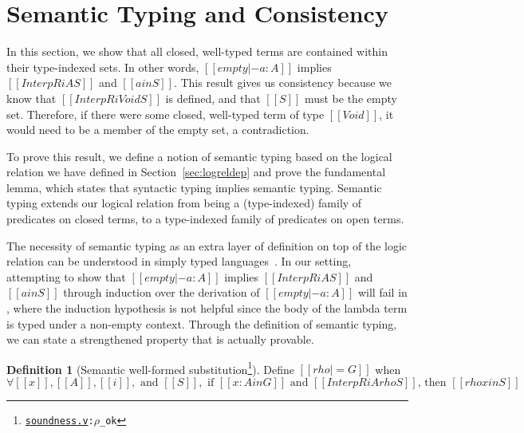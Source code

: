 \documentclass[\ifpublic nolinenum\else\fi,online,OA]{jfp}
\newcommand{\scw}[1]{}
\newcommand{\dotv}[2]{\href{#1}{\texttt{#1}}{\texttt{:#2}}}
\theoremstyle{definition}
\newtheorem{definition}[theorem]{Definition}
\begin{document}
\section{Semantic Typing and Consistency}
\label{sec:logrelproof}
\scw{Would it make sense to define the notation $a \in [\![A]\!]^i$ when
there exists some $S$ such that $[[InterpR i A S]]$ and $[[a in S]]$ ?}

In this section, we show that all closed, well-typed terms are contained
within their type-indexed sets. In other words, $[[empty |- a : A]]$ implies
$[[InterpR i A S]]$ and $[[a in S]]$.  This result gives us consistency
because we know that $[[InterpR i Void S]]$ is defined, and that $[[S]]$ must
be the empty set. Therefore, if there were some closed, well-typed term of type
$[[Void]]$, it would need to be a member of the empty set, a contradiction.

To prove this result, we define a notion of semantic typing based on the
logical relation we have defined in Section~\ref{sec:logreldep} and prove the
fundamental lemma, which states that syntactic typing implies semantic typing.
Semantic typing extends our logical relation from being a (type-indexed)
family of predicates on closed terms, to a type-indexed family of predicates
on open terms.

The necessity of semantic typing as an extra layer of
definition on top of the logic relation can be understood in simply typed
languages~\citep{skorstengaard2019introduction, harpertait,
  pierce2002types}. In our setting, attempting to show that
$[[empty |- a : A]]$ implies $[[InterpR i A S]]$ and $[[a in S]]$ through induction over the derivation of $[[empty |- a : A]]$ will fail in
, where the induction hypothesis is not helpful since the body of
the lambda term is typed under a non-empty context. Through the definition of
semantic typing, we can state a strengthened property that is actually
provable.

\begin{definition}[Semantic well-formed substitution\footnote{\dotv{soundness.v}{$\rho$\_ok}}]
Define $[[rho |= G]]$ when
\[ \forall [[x]], [[A]], [[i]], \text { and } [[S]], \text{ if }[[x :
  A in G]]\text{ and
                     } [[InterpR i A { rho } S ]] \text{, then } [[rho x in S]] \]
\end{definition}

\end{document}
